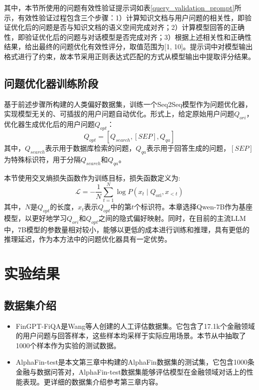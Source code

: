其中，本节所使用的问题有效性验证提示词如表\ref{query_validation_prompt}所示，有效性验证过程包含三个步骤：1）计算知识文档与用户问题的相关性，即验证优化后的问题是否与知识文档的语义空间完成对齐；2）计算模型回答的正确性，即验证优化后的问题与对话模型是否完成对齐；3）根据上述相关性和正确性结果，给出最终的问题优化有效性评分，取值范围为[1, 10]。提示词中对模型输出格式进行了约束，故本节采用正则表达式匹配的方式从模型输出中提取评分结果。

\subsection{问题优化器训练阶段}

基于前述步骤所构建的人类偏好数据集，训练一个Seq2Seq\cite{DBLP:journals/corr/abs-2309-16609}模型作为问题优化器，实现模型无关的、可插拔的用户问题自动优化。形式上，给定原始用户问题$Q_{ori}$，优化器生成优化后的用户问题$Q_{opt}$：
\begin{equation}
	Q_{opt} = [Q_{search}, [SEP], Q_{qa}]
\end{equation}
其中，$Q_{search}$表示用于数据库检索的问题，$Q_{qa}$表示用于回答生成的问题，$[SEP]$为特殊标识符，用于分隔$Q_{search}$和$Q_{qa}$。

本节使用交叉熵损失函数作为训练目标，损失函数定义为:
\begin{equation}
	\mathcal{L}=-\frac{1}{N} \sum_{t=1}^N \log P\left(x_t \mid Q_{\text{ori}}, x_{<t}\right)
\end{equation}
其中，$N$是$Q_{opt}$的长度，$x_t$表示$Q_{opt}$中的第$t$个标识符。本章选择Qwen-7B作为基座模型，以更好地学习$Q_{ori}$和$Q_{opt}$之间的隐式偏好映射。同时，在目前的主流LLM中，7B模型的参数量相对较小，能够以更低的成本进行训练和推理，具有更低的推理延迟，作为本方法中的问题优化器具有一定优势。

\section{实验结果}

\subsection{数据集介绍}

\begin{itemize}[topsep = 0 pt, itemsep= 0 pt, parsep=0pt, partopsep=0pt, leftmargin=36pt, itemindent=0pt, labelsep=6pt, listparindent=24pt]
	\item FinGPT-FiQA\cite{wang2023fingptbenchmark}是Wang等人创建的人工评估数据集。它包含了17.1k个金融领域的用户问题与回答样本，这些样本均采样于实际应用场景。本节从中抽取了1000个样本作为实验的测试数据。
	\item AlphaFin-test是本文第三章中构建的AlphaFin数据集的测试集，它包含1000条金融与数据问答对，AlphaFin-test数据集能够评估模型在金融领域对话上的性能表现。更详细的数据集介绍参考第三章内容。
\end{itemize}

